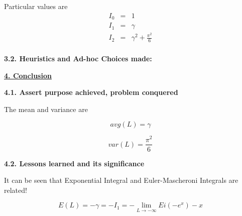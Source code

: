 \documentclass{beamer}
\begin{document}
Particular values are
\begin{eqnarray*}
  \label{eqn:3_6}
I_0 	&=& 1 \\
I_1 	&=& \gamma \\
I_2 	&=& \gamma^2 + \frac{\pi^2}{6} \\
\end{eqnarray*}

\textbf{3.2. Heuristics and Ad-hoc Choices made: }

\underline{\textbf{4. Conclusion}}

\textbf{4.1. Assert purpose achieved, problem conquered}

The mean and variance are

\begin{equation}
\label{eqn:4_1}
avg(L) = \gamma
\end{equation}

\begin{equation}
\label{eqn:4_2}
var(L) = \frac{\pi^2}{6}
\end{equation}

\textbf{4.2. Lessons learned and its significance}

It can be seen that Exponential Integral and Euler-Mascheroni Integrals are related!

\begin{equation}
\label{eqn:3_7}
E(L) = - \gamma = -I_1 = - \lim_{L \to -\infty}  {Ei(-e^x)- x }
\end{equation}
\end{document}
